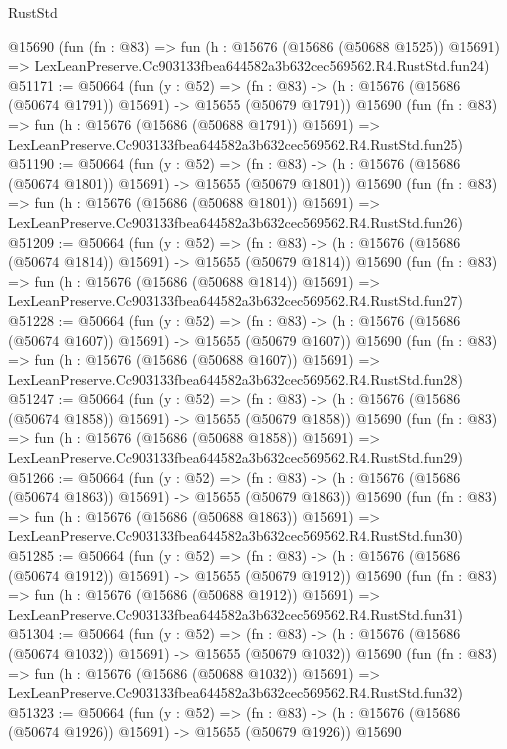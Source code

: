 \begin{lexlean}{RustStd}
\begin{coremodule}
    @15690
    (fun (fn : @83) =>
    fun (h : @15676 (@15686 (@50688 @1525)) @15691) =>
    LexLeanPreserve.Cc903133fbea644582a3b632cec569562.R4.RustStd.fun24)
@51171 := @50664
    (fun (y : @52) =>
    (fn : @83) -> (h : @15676 (@15686 (@50674 @1791)) @15691) -> @15655 (@50679 @1791))
    @15690
    (fun (fn : @83) =>
    fun (h : @15676 (@15686 (@50688 @1791)) @15691) =>
    LexLeanPreserve.Cc903133fbea644582a3b632cec569562.R4.RustStd.fun25)
@51190 := @50664
    (fun (y : @52) =>
    (fn : @83) -> (h : @15676 (@15686 (@50674 @1801)) @15691) -> @15655 (@50679 @1801))
    @15690
    (fun (fn : @83) =>
    fun (h : @15676 (@15686 (@50688 @1801)) @15691) =>
    LexLeanPreserve.Cc903133fbea644582a3b632cec569562.R4.RustStd.fun26)
@51209 := @50664
    (fun (y : @52) =>
    (fn : @83) -> (h : @15676 (@15686 (@50674 @1814)) @15691) -> @15655 (@50679 @1814))
    @15690
    (fun (fn : @83) =>
    fun (h : @15676 (@15686 (@50688 @1814)) @15691) =>
    LexLeanPreserve.Cc903133fbea644582a3b632cec569562.R4.RustStd.fun27)
@51228 := @50664
    (fun (y : @52) =>
    (fn : @83) -> (h : @15676 (@15686 (@50674 @1607)) @15691) -> @15655 (@50679 @1607))
    @15690
    (fun (fn : @83) =>
    fun (h : @15676 (@15686 (@50688 @1607)) @15691) =>
    LexLeanPreserve.Cc903133fbea644582a3b632cec569562.R4.RustStd.fun28)
@51247 := @50664
    (fun (y : @52) =>
    (fn : @83) -> (h : @15676 (@15686 (@50674 @1858)) @15691) -> @15655 (@50679 @1858))
    @15690
    (fun (fn : @83) =>
    fun (h : @15676 (@15686 (@50688 @1858)) @15691) =>
    LexLeanPreserve.Cc903133fbea644582a3b632cec569562.R4.RustStd.fun29)
@51266 := @50664
    (fun (y : @52) =>
    (fn : @83) -> (h : @15676 (@15686 (@50674 @1863)) @15691) -> @15655 (@50679 @1863))
    @15690
    (fun (fn : @83) =>
    fun (h : @15676 (@15686 (@50688 @1863)) @15691) =>
    LexLeanPreserve.Cc903133fbea644582a3b632cec569562.R4.RustStd.fun30)
@51285 := @50664
    (fun (y : @52) =>
    (fn : @83) -> (h : @15676 (@15686 (@50674 @1912)) @15691) -> @15655 (@50679 @1912))
    @15690
    (fun (fn : @83) =>
    fun (h : @15676 (@15686 (@50688 @1912)) @15691) =>
    LexLeanPreserve.Cc903133fbea644582a3b632cec569562.R4.RustStd.fun31)
@51304 := @50664
    (fun (y : @52) =>
    (fn : @83) -> (h : @15676 (@15686 (@50674 @1032)) @15691) -> @15655 (@50679 @1032))
    @15690
    (fun (fn : @83) =>
    fun (h : @15676 (@15686 (@50688 @1032)) @15691) =>
    LexLeanPreserve.Cc903133fbea644582a3b632cec569562.R4.RustStd.fun32)
@51323 := @50664
    (fun (y : @52) =>
    (fn : @83) -> (h : @15676 (@15686 (@50674 @1926)) @15691) -> @15655 (@50679 @1926))
    @15690

\end{coremodule}
\end{lexlean}
